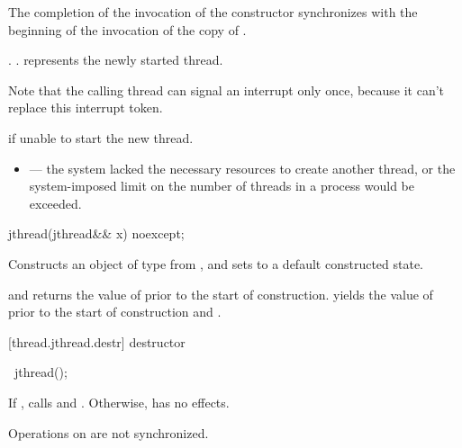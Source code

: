 \begin{itemdescr}
\pnum\sync The completion of the invocation of the constructor
synchronizes with the beginning of the invocation of the copy of .

\pnum\postconditions {}.
{\color{diffcolor}
                     .
}
                      represents the newly started thread.
{\color{diffcolor}
\begin{note} Note that the calling thread can signal an interrupt only once,
                because it can't replace this interrupt token.  \end{note}
}%

\pnum\throws {} if unable to start the new thread.

\pnum\errors
\begin{itemize}
\item {} --- the system lacked the necessary
resources to create another thread, or the system-imposed limit on the number of
threads in a process would be exceeded.
\end{itemize}
\end{itemdescr}

%
\begin{itemdecl}
jthread(jthread&& x) noexcept;
\end{itemdecl}

\begin{itemdescr}
\pnum
\effects Constructs an object of type  from , and sets
 to a default constructed state.

\pnum
\postconditions {} and  returns the
value of  prior to the start of construction.
{\color{diffcolor}
 yields the value of  prior to the start of construction
and .
}%

\end{itemdescr}

[thread.jthread.destr]{ destructor}

%
\begin{itemdecl}
~jthread();
\end{itemdecl}

{\color{diffcolor}
\begin{itemdescr}
\pnum
If , calls  and .
Otherwise, has no effects.
\begin{note} Operations on  are not synchronized. \end{note}
\end{itemdescr}
}%

